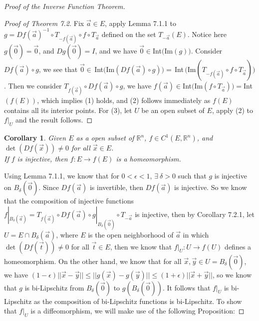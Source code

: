 \documentclass[11pt,oneside]{book}
\theoremstyle{break}
\theoremstyle{break}
\newtheorem{corT}[lem]{Corollary}
\newcommand{\R}{\mathbb{R}}
\begin{document}
\begin{proof}[Proof of the Inverse Function Theorem]
\begin{proof}[Proof of Theorem 7.2]
\setlength{\leftskip}{1cm} Fix $\vec{a}\in E$, apply Lemma 7.1.1 to $g = Df(\vec{a})^{-1} \circ T_{-f(\vec{a})}\circ f \circ T_{\vec{a}}$ defined on the set $T_{-\vec{a}}(E)$. Notice here $g(\vec{0}) = \vec{0}$, and $Dg(\vec{0}) = I$, and we have $\vec{0}\in $Int$($Im$(g))$. Consider $Df(\vec{a})\circ g$, we see that $\vec{0}\in $\,Int$($Im$(Df(\vec{a})\circ g))=$\,Int\,$($Im$(T_{-f(\vec{a})}\circ f\circ T_{\vec{a}}))$. Then we consider $T_{f(\vec{a})}\circ Df(\vec{a})\circ g$, we have $f(\vec{a})\in$Int$($Im$(f\circ T_{\vec{a}}))=$Int$(f(E))$, which implies (1) holds, and (2) follows immediately as $f(E)$ contains all its interior points. For (3), let $U$ be an open subset of $E$, apply (2) to $f|_U$ and the result follows.
\end{proof}

\begin{corT}
\setlength{\leftskip}{1cm} Given $E$ as a open subset of $\R^n$, $f \in C^1(E,\R^n)$, and $\det(Df(\vec{x})) \neq 0$ for all $\vec{x}\in E$.\\ If $f$ is injective, then $f:E \to f(E)$ is a homeomorphism.
\end{corT}


Using Lemma 7.1.1, we know that for $0<\epsilon<1$, $\exists\ \delta>0$ such that $g$ is injective on $B_{\delta}(\vec{0})$. Since $Df(\vec{a})$ is invertible, then $Df(\vec{a})$ is injective. So we know that the composition of injective functions $f|_{B_{\delta}(\vec{a})}=T_{f(\vec{a})} \circ Df(\vec{a}) \circ g|_{B_{\delta}(\vec{0})} \circ T_{-\vec{a}}$ is injective, then by Corollary 7.2.1, let $U = E \cap B_{\delta}(\vec{a})$, where $E$ is the open neighborhood of $\vec{a}$ in which $\det(Df(\vec{t})) \neq 0$ for all $\vec{t}\in E$, then we know that $f|_U: U\to f(U)$ defines a homeomorphism. On the other hand, we know that for all $\vec{x},\vec{y} \in U = B_\delta(\vec{0})$, we have $(1-\epsilon)||\vec{x}-\vec{y}|| \leq ||g(\vec{x}) - g(\vec{y}) || \leq (1+\epsilon) ||\vec{x}+\vec{y}||$, so we know that $g$ is bi-Lipschitz from $B_{\delta}(\vec{0})$ to $g(B_{\delta}(\vec{0}))$. It follows that $f|_U$ is bi-Lipschitz as the composition of bi-Lipschitz functions is bi-Lipschitz. To show that $f|_U$ is a diffeomorphism, we will make use of the following Proposition:



\end{proof}
\end{document}
